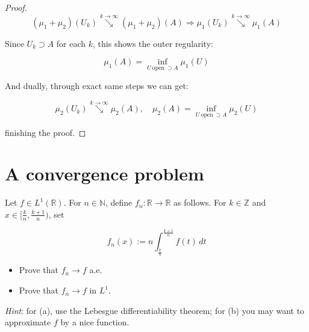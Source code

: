 \begin{proof}
\[(\mu_{1} + \mu_{2})(U_{k})\operatorname{\searrow }\limits^{k\rightarrow\infty}(\mu_{1} + \mu_{2})(A)\Longrightarrow\mu_{1}(U_{k})\operatorname{\searrow }\limits^{k\rightarrow\infty}\mu_{1}(A)\]

Since \(U_{k} \supset A\) for each \(k\), this shows the outer regularity:

\[\mu_{1}(A) = \inf\limits_{U\ \text{open}\  \supset A}\mu_{1}(U)\]

And dually, through exact same steps we can get:

\[\mu_{2}(U_{k})\operatorname{\searrow }\limits^{k\rightarrow\infty}\mu_{2}(A),\quad\mu_{2}(A) = \inf\limits_{U\ \text{open}\  \supset A}\mu_{2}(U)\]

finishing the proof.

\end{proof}

\section{A convergence problem}\label{a-convergence-problem}

Let \(f \in L^{1}(\mathbb{R})\). For \(n \in \mathbb{N}\), define \(f_{n}:\mathbb{R}\rightarrow\mathbb{R}\) as follows. For \(k \in \mathbb{Z}\) and \(x \in \lbrack\frac{k}{n},\frac{k + 1}{n})\), set

\[f_{n}(x) := n\int_{\frac{k}{n}}^{\frac{k + 1}{n}}f(t)\, dt\]

\begin{itemize}
\item
  Prove that \(f_{n}\rightarrow f\) a.e.
\item
  Prove that \(f_{n}\rightarrow f\) in \(L^{1}\).
\end{itemize}

\emph{Hint}: for (a), use the Lebesgue differentiability theorem; for (b) you may want to approximate \(f\) by a nice function.


